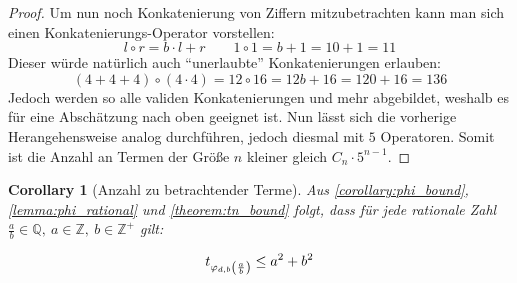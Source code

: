 \documentclass{article}
\newtheorem{corollary}{Corollary}[theorem]
\theoremstyle{nonumberplain}
\newtheorem{proof}{Beweis}
\begin{document}
\begin{proof}
    Um nun noch Konkatenierung von Ziffern mitzubetrachten kann man sich einen Konkatenierungs-Operator vorstellen:
    \[l \circ r = b \cdot l + r \quad\quad 1\circ1 = b + 1 = 10 + 1 = 11\]
    Dieser würde natürlich auch ``unerlaubte'' Konkatenierungen erlauben:
    \[(4+4+4) \circ (4\cdot4) = 12 \circ 16 = 12b + 16 = 120 + 16 = 136\]
    Jedoch werden so alle validen Konkatenierungen und mehr abgebildet, weshalb es für eine Abschätzung nach oben geeignet ist.
    Nun lässt sich die vorherige Herangehensweise analog durchführen, jedoch diesmal mit \(5\) Operatoren.
    Somit ist die Anzahl an Termen der Größe \(n\) kleiner gleich \(C_n \cdot 5^{n-1}\).
\end{proof}

\begin{corollary}[Anzahl zu betrachtender Terme]
    Aus \ref{corollary:phi_bound}, \ref{lemma:phi_rational} und \ref{theorem:tn_bound} folgt, dass für jede rationale Zahl \(\frac{a}{b}\in\mathbb{Q},\ a\in\mathbb{Z},\ b\in\mathbb{Z}^+\) gilt:

        \[t_{\varphi_{d,b}\left(\frac{a}{b}\right)} \leq a^2+b^2\]
\end{corollary}
\end{document}
